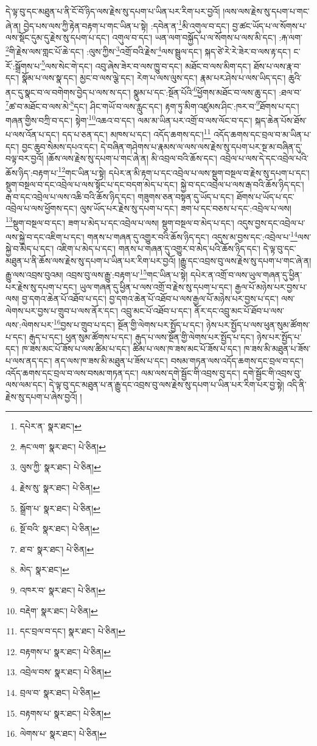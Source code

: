 དེ་ལྟ་བུ་དང་མཐུན་པ་ནི་ངོ་བོ་ཉིད་ལས་རྗེས་སུ་དཔག་པ་ཡིན་པར་རིག་པར་བྱའོ། །ལས་ལས་རྗེས་སུ་དཔག་པ་གང་ཞེ་ན། བྱེད་པས་ལས་ཀྱི་རྟེན་བརྟག་པ་གང་ཡིན་པ་སྟེ། :དབེན་ན་\footnote{དཔེར་ན་  སྣར་ཐང་། }མི་འགུལ་བ་དང་། བྱ་ཚང་ཡོད་པ་ལ་སོགས་པ་ལས་སྡོང་དུམ་དུ་རྗེས་སུ་དཔག་པ་དང་། འགུལ་བ་དང་། ཡན་ལག་བསྐྱོད་པ་ལ་སོགས་པ་ལས་མི་དང་། :རྐ་ལག་\footnote{རྐང་ལག་  སྣར་ཐང་།  པེ་ཅིན། }གི་རྗེས་ལས་གླང་པོ་ཆེ་དང་། :ལུས་ཀྱིས་\footnote{ལུས་ཀྱི་  སྣར་ཐང་།  པེ་ཅིན། }འགྲོ་བའི་རྗེས་\footnote{རྗེས་སུ་  སྣར་ཐང་།  པེ་ཅིན། }ལས་སྦྲུལ་དང་། སྐད་ཙེ་རེ་རེ་ཟེར་བ་ལས་རྟ་དང་། ང་རོ་:སྒྲོགས་པ་\footnote{སྒྲོག་པ་  སྣར་ཐང་།  པེ་ཅིན། }ལས་སེང་གེ་དང་། འབུ་ཞེས་ཟེར་བ་ལས་ཁྱུ་བ་དང་། མཐོང་བ་ལས་མིག་དང་། ཐོས་པ་ལས་རྣ་བ་དང་། སྣོམ་པ་ལས་སྣ་དང་། མྱང་བ་ལས་ལྕེ་དང་། རེག་པ་ལས་ལུས་དང་། རྣམ་པར་ཤེས་པ་ལས་ཡིད་དང་། ཆུའི་ནང་དུ་སྣང་བ་ལ་བགེགས་བྱེད་པ་ལས་ས་དང་། སྣུམ་པ་དང་:སྔོན་པོའི་\footnote{སྔོ་བའི་  སྣར་ཐང་།  པེ་ཅིན། }ཕྱོགས་མཐོང་བ་ལས་ཆུ་དང་། :ཐལ་བ་\footnote{ཐ་བ་  སྣར་ཐང་།  པེ་ཅིན། }ཚ་བ་མཐོང་བ་ལས་མེ་\footnote{མེད་  སྣར་ཐང་། }དང་། ཤིང་གཡོ་བ་ལས་རླུང་དང་། རྟག་ཏུ་མིག་འཛུམས་ཤིང་:ཁར་བ་\footnote{འཁར་བ་  སྣར་ཐང་།  པེ་ཅིན། }ཐོགས་པ་དང་། གཞན་གྱིས་བཀྲི་བ་དང་། སྟེག་\footnote{བརྡེག་  སྣར་ཐང་།  པེ་ཅིན། }འཆའ་བ་དང་། ལམ་མ་ཡིན་པར་འགྲོ་བ་ལས་ལོང་བ་དང་། སྐད་ཆེན་པོས་ཐོས་པ་ལས་འོན་པ་དང་། དད་པ་ཅན་དང་། མཁས་པ་དང་། འདོད་ཆགས་དང་།\footnote{དང་བྲལ་བ་དང་།  སྣར་ཐང་།  པེ་ཅིན། } འདོད་ཆགས་དང་བྲལ་བ་མ་ཡིན་པ་དང་། བྱང་ཆུབ་སེམས་དཔའ་དང་། དེ་བཞིན་གཤེགས་པ་རྣམས་ལ་ལས་ལས་རྗེས་སུ་དཔག་པར་སྔ་མ་བཞིན་དུ་བལྟ་བར་བྱའོ། །ཆོས་ལས་རྗེས་སུ་དཔག་པ་གང་ཞེ་ན། མི་འབྲལ་བའི་ཆོས་དང་། འབྲེལ་པ་ལས་དེ་དང་འབྲེལ་པའི་ཆོས་ཉིད་:བརྟག་པ་\footnote{བརྟགས་པ་  སྣར་ཐང་།  པེ་ཅིན། }གང་ཡིན་པ་སྟེ། དཔེར་ན་མི་རྟག་པ་དང་འབྲེལ་པ་ལས་སྡུག་བསྔལ་བ་རྗེས་སུ་དཔག་པ་དང་། སྡུག་བསྔལ་བ་དང་འབྲེལ་པ་ལས་སྟོང་པ་དང་བདག་མེད་པ་དང་། སྐྱེ་བ་དང་འབྲེལ་པ་ལས་རྒ་བའི་ཆོས་ཉིད་དང་། རྒ་བ་དང་འབྲེལ་པ་ལས་འཆི་བའི་ཆོས་ཉིད་དང་། གཟུགས་ཅན་བསྟན་དུ་ཡོད་པ་དང་། ཐོགས་པ་ཡོད་པ་དང་འབྲེལ་པ་ལས་ཕྱོགས་དང་། ལུས་ཡོད་པར་རྗེས་སུ་དཔག་པ་དང་། ཟག་པ་དང་བཅས་པ་དང་:འབྲེལ་པ་ལས། \footnote{འབྲེལ་བས་  སྣར་ཐང་།  པེ་ཅིན། }སྡུག་བསྔལ་བ་དང་། ཟག་པ་མེད་པ་དང་འབྲེལ་པ་ལས། སྡུག་བསྔལ་བ་མེད་པ་དང་། འདུས་བྱས་དང་འབྲེལ་པ་ལས་སྐྱེ་བ་དང་འཇིག་པ་དང་། གནས་པ་གཞན་དུ་འགྱུར་བའི་ཆོས་ཉིད་དང་། འདུས་མ་བྱས་དང་:འབྲེལ་པ་\footnote{བྲལ་བ་  སྣར་ཐང་།  པེ་ཅིན། }ལས་སྐྱེ་བ་མེད་པ་དང་། འཇིག་པ་མེད་པ་དང་། གནས་པ་གཞན་དུ་འགྱུར་བ་མེད་པའི་ཆོས་ཉིད་དང་། དེ་ལྟ་བུ་དང་མཐུན་པ་ནི་ཆོས་ལས་རྗེས་སུ་དཔག་པ་ཡིན་པར་རིག་པར་བྱའོ། །རྒྱུ་དང་འབྲས་བུ་ལས་རྗེས་སུ་དཔག་པ་གང་ཞེ་ན། རྒྱུ་ལས་འབྲས་བུའམ། འབྲས་བུ་ལས་རྒྱུ་:བརྟག་པ་\footnote{བརྟགས་པ་  སྣར་ཐང་།  པེ་ཅིན། }གང་ཡིན་པ་སྟེ། དཔེར་ན་འགྲོ་བ་ལས་ཡུལ་གཞན་དུ་ཕྱིན་པར་རྗེས་སུ་དཔག་པ་དང་། ཡུལ་གཞན་དུ་ཕྱིན་པ་ལས་འགྲོ་བ་རྗེས་སུ་དཔག་པ་དང་། རྒྱལ་པོ་མཉེས་པར་བྱས་པ་ལས། བྱ་དགའ་ཆེན་པོ་འཐོབ་པ་དང་། བྱ་དགའ་ཆེན་པོ་འཐོབ་པ་ལས་རྒྱལ་པོ་མཉེས་པར་བྱས་པ་དང་། ལས་ལེགས་པར་བྱས་པ་གྲུབ་པ་ལས་ནོར་དང་། འབྲུ་མང་པོ་འཐོབ་པ་དང་། ནོར་དང་འབྲུ་མང་པོ་ཐོབ་པ་ལས་ལས་:ལེགས་པར་\footnote{ལེགས་པ་  སྣར་ཐང་།  པེ་ཅིན། }བྱས་པ་གྲུབ་པ་དང་། སྔོན་གྱི་ལེགས་པར་སྤྱོད་པ་དང་། ཉེས་པར་སྤྱོད་པ་ལས་ཕུན་སུམ་ཚོགས་པ་དང་། རྒུད་པ་དང་། ཕུན་སུམ་ཚོགས་པ་དང་། རྒུད་པ་ལས་སྔོན་གྱི་ལེགས་པར་སྤྱོད་པ་དང་། ཉེས་པར་སྤྱོད་པ་དང་། ཁ་ཟས་མང་པོ་ཟོས་པ་ལས་ཚིམ་པ་དང་། ཚིམ་པ་ལས་ཁ་ཟས་མང་པོ་ཟོས་པ་དང་། ཁ་ཟས་མི་མཐུན་པ་ཟོས་པ་ལས་ནད་དང་། ནད་ལས་ཁ་ཟས་མི་མཐུན་པ་ཟོས་པ་དང་། བསམ་གཏན་ལས་འདོད་ཆགས་དང་བྲལ་བ་དང་། འདོད་ཆགས་དང་བྲལ་བ་ལས་བསམ་གཏན་དང་། ལམ་ལས་དགེ་སྦྱོང་གི་འབྲས་བུ་དང་། དགེ་སྦྱོང་གི་འབྲས་བུ་ལས་ལམ་དང་། དེ་ལྟ་བུ་དང་མཐུན་པ་ན་རྒྱུ་དང་འབྲས་བུ་ལས་རྗེས་སུ་དཔག་པ་ཡིན་པར་རིག་པར་བྱ་སྟེ། འདི་ནི་རྗེས་སུ་དཔག་པ་ཞེས་བྱའོ། །
